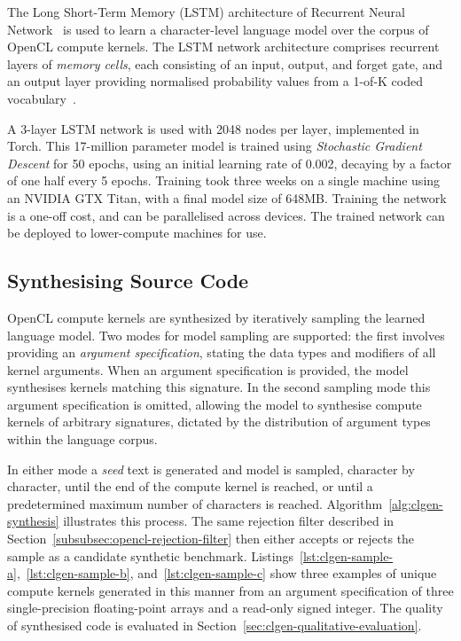 The Long Short-Term Memory (LSTM) architecture of Recurrent Neural Network~\cite{Sundermeyer2012,Mikolov2015} is used to learn a character-level language model over the corpus of OpenCL compute kernels. The LSTM network architecture comprises recurrent layers of \emph{memory cells}, each consisting of an input, output, and forget gate, and an output layer providing normalised probability values from a 1-of-K coded vocabulary~\cite{Graves}.

A 3-layer LSTM network is used with 2048 nodes per layer, implemented in Torch. This 17-million parameter model is trained using \textit{Stochastic Gradient Descent} for 50 epochs, using an initial learning rate of 0.002, decaying by a factor of one half every 5 epochs. Training took three weeks on a single machine using an NVIDIA GTX Titan, with a final model size of 648MB. Training the network is a one-off cost, and can be parallelised across devices. The trained network can be deployed to lower-compute machines for use.

\subsection{Synthesising Source Code}
\label{subsec:synthesizing-opencl}

OpenCL compute kernels are synthesized by iteratively sampling the learned language model. Two modes for model sampling are supported: the first involves providing an \emph{argument specification}, stating the data types and modifiers of all kernel arguments. When an argument specification is provided, the model synthesises kernels matching this signature. In the second sampling mode this argument specification is omitted, allowing the model to synthesise compute kernels of arbitrary signatures, dictated by the distribution of argument types within the language corpus.

In either mode a \emph{seed} text is generated and model is sampled, character by character, until the end of the compute kernel is reached, or until a predetermined maximum number of characters is reached. Algorithm~\ref{alg:clgen-synthesis} illustrates this process. The same rejection filter described in Section~\ref{subsubsec:opencl-rejection-filter} then either accepts or rejects the sample as a candidate synthetic benchmark. Listings~\ref{lst:clgen-sample-a},~\ref{lst:clgen-sample-b}, and~\ref{lst:clgen-sample-c} show three examples of unique compute kernels generated in this manner from an argument specification of three single-precision floating-point arrays and a read-only signed integer. The quality of synthesised code is evaluated in Section~\ref{sec:clgen-qualitative-evaluation}.

